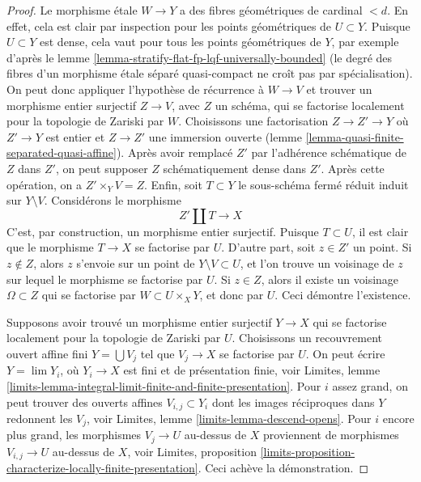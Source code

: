 \begin{proof}
\medskip\noindent
Le morphisme \'etale $W \to Y$ a des fibres géométriques de cardinal $< d$.
En effet, cela est clair par inspection pour les points géométriques de $U \subset Y$.
Puisque $U \subset Y$ est dense, cela vaut pour tous les points géométriques de $Y$,
par exemple d'après le lemme
\ref{lemma-stratify-flat-fp-lqf-universally-bounded}
(le degré des fibres d'un morphisme \'etale séparé quasi-compact
ne croît pas par spécialisation). On peut donc appliquer l'hypothèse de récurrence
à $W \to V$ et trouver un morphisme entier surjectif
$Z \to V$, avec $Z$ un schéma, qui se factorise localement pour la topologie de Zariski par $W$.
Choisissons une factorisation $Z \to Z' \to Y$ où $Z' \to Y$ est entier et
$Z \to Z'$ une immersion ouverte
(lemme \ref{lemma-quasi-finite-separated-quasi-affine}).
Après avoir remplacé $Z'$ par l'adhérence schématique de $Z$ dans $Z'$,
on peut supposer $Z$ schématiquement dense dans $Z'$.
Après cette opération, on a $Z' \times_Y V = Z$. Enfin,
soit $T \subset Y$ le sous-schéma fermé réduit induit
sur $Y \setminus V$. Considérons le morphisme
$$
Z' \amalg T \longrightarrow X
$$
C'est, par construction, un morphisme entier surjectif.
Puisque $T \subset U$, il est clair que le morphisme $T \to X$
se factorise par $U$. D'autre part, soit $z \in Z'$
un point. Si $z \not \in Z$, alors $z$ s'envoie sur un point de
$Y \setminus V \subset U$, et l'on trouve un voisinage de $z$
sur lequel le morphisme se factorise par $U$.
Si $z \in Z$, alors il existe un voisinage $\Omega \subset Z$
qui se factorise par $W \subset U \times_X Y$, et donc par $U$.
Ceci démontre l'existence.

\medskip\noindent
Supposons avoir trouvé un morphisme entier surjectif $Y \to X$ qui se factorise
localement pour la topologie de Zariski par $U$. Choisissons un recouvrement ouvert affine fini
$Y = \bigcup V_j$ tel que $V_j \to X$ se factorise par $U$. On peut
écrire $Y = \lim Y_i$, où $Y_i \to X$ est fini et de présentation
finie, voir Limites, lemme
\ref{limits-lemma-integral-limit-finite-and-finite-presentation}.
Pour $i$ assez grand, on peut trouver des ouverts affines $V_{i, j} \subset Y_i$
dont les images réciproques dans $Y$ redonnent les $V_j$, voir
Limites, lemme \ref{limits-lemma-descend-opens}.
Pour $i$ encore plus grand, les morphismes $V_j \to U$ au-dessus de $X$
proviennent de morphismes $V_{i, j} \to U$ au-dessus de $X$, voir
Limites, proposition
\ref{limits-proposition-characterize-locally-finite-presentation}.
Ceci achève la démonstration.
\end{proof}







